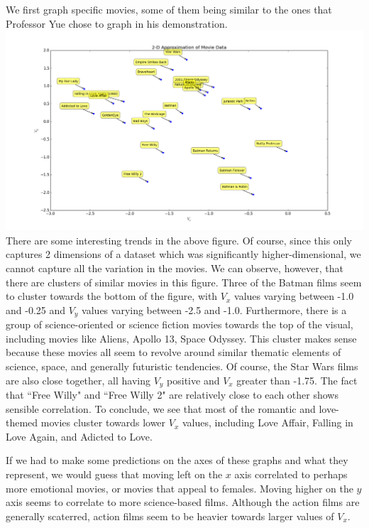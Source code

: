 \documentclass{article}
\begin{document}
We first graph specific movies, some of them being similar to the ones
that Professor Yue chose to graph in his demonstration.\\
\includegraphics[width=1\textwidth]{final_graph_1}
There are some interesting trends in the above figure. Of course, since
this only captures 2 dimensions of a dataset which was significantly
higher-dimensional, we cannot capture all the variation in the movies.
We can observe, however, that there are clusters of similar movies
in this figure. Three of the Batman films seem to cluster towards the bottom
of the figure, with $V_{x}$ values varying between -1.0 and -0.25 and
$V_y$ values varying between -2.5 and -1.0. Furthermore, there is a group
of science-oriented or science fiction movies towards the top of the visual,
including movies like Aliens, Apollo 13, Space Odyssey. This cluster makes
sense because these movies all seem to revolve around similar thematic elements
of science, space, and generally futuristic tendencies. Of course, the Star Wars
films are also close together, all having $V_{y}$ positive and $V_x$ greater than
-1.75. The fact that ``Free Willy" and ``Free Willy 2" are relatively close
to each other shows sensible correlation. To conclude, we see that most of
the romantic and love-themed movies cluster towards lower $V_x$ values,
including Love Affair, Falling in Love Again, and Adicted to Love.

If we had to make some predictions on the axes of these graphs and what they
represent, we would guess that moving left on the $x$ axis correlated
to perhaps more emotional movies, or movies that appeal to females. Moving
higher on the $y$ axis seems to correlate to more science-based films. Although
the action films are generally scaterred, action films seem to be heavier
towards larger values of $V_x$.\\
\end{document}

